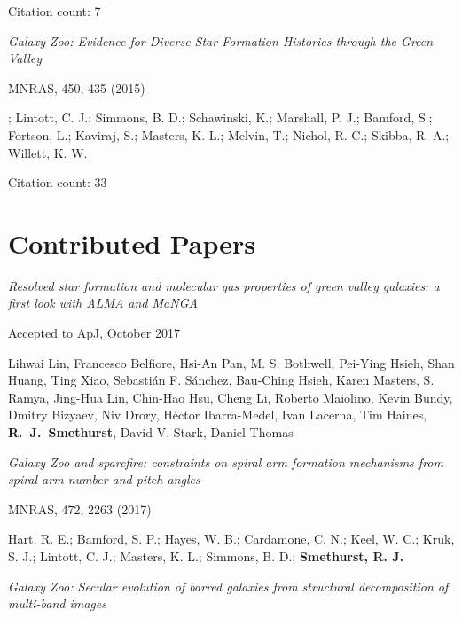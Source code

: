 \documentclass{article}
\begin{document}
\indent \indent Citation count: 7

\medskip

\hangindent=15pt \indent \emph{Galaxy Zoo: Evidence for Diverse Star Formation Histories through the Green Valley}

\indent \indent MNRAS, 450, 435 (2015)

\hangindent=30pt \indent {}; Lintott, C. J.; Simmons, B. D.; Schawinski, K.; Marshall, P. J.; Bamford, S.; Fortson, L.; Kaviraj, S.; Masters, K. L.; Melvin, T.; Nichol, R. C.; Skibba, R. A.; Willett, K. W.

\indent \indent Citation count: 33

\noindent\makebox[\linewidth]{\rule{0.85\paperwidth}{0.2pt}}


\section*{Contributed Papers}


\medskip


\hangindent=15pt \indent \indent \emph{Resolved star formation and molecular gas properties of green valley galaxies: a first look with ALMA and MaNGA}

\indent \indent Accepted to ApJ, October 2017

\hangindent=30pt \indent \indent Lihwai Lin, Francesco Belfiore, Hsi-An Pan, M. S. Bothwell, Pei-Ying Hsieh, Shan Huang, Ting Xiao, Sebasti\'an F. S\'anchez, Bau-Ching Hsieh, Karen Masters, S. Ramya, Jing-Hua Lin, Chin-Hao Hsu, Cheng Li, Roberto Maiolino, Kevin Bundy, Dmitry Bizyaev, Niv Drory, H\'ector Ibarra-Medel, Ivan Lacerna, Tim Haines, {\bf R.~J.~Smethurst}, David V. Stark, Daniel Thomas 


\medskip

\hangindent=15pt \indent \emph{Galaxy Zoo and sparcfire: constraints on spiral arm formation mechanisms from spiral arm number and pitch angles}

\indent \indent MNRAS, 472, 2263 (2017)

\hangindent=30pt \indent \indent Hart, R. E.; Bamford, S. P.; Hayes, W. B.; Cardamone, C. N.; Keel, W. C.; Kruk, S. J.; Lintott, C. J.; Masters, K. L.; Simmons, B. D.; {\bf Smethurst, R. J.}

\medskip

\newpage

\hangindent=15pt \indent \emph{Galaxy Zoo: Secular evolution of barred galaxies from structural decomposition of multi-band images}
\end{document}
